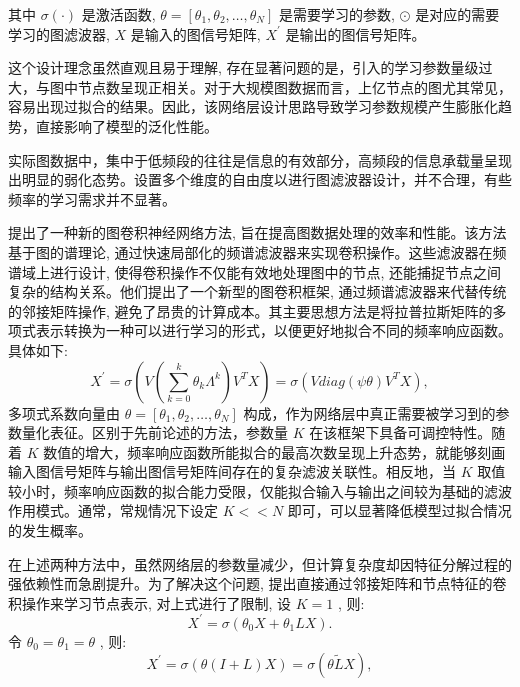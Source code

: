 其中 \(\sigma \left( \cdot \right)\) 是激活函数, \(\theta  = \left\lbrack  {{\theta }_{1}, {\theta }_{2}, \ldots , {\theta }_{N}}\right\rbrack\) 是需要学习的参数, \(\odot\) 是对应的需要学习的图滤波器, \({X}\) 是输入的图信号矩阵, \({{X}}^{\prime }\) 是输出的图信号矩阵。

这个设计理念虽然直观且易于理解, 存在显著问题的是，引入的学习参数量级过大，与图中节点数呈现正相关。对于大规模图数据而言，上亿节点的图尤其常见，容易出现过拟合的结果。因此，该网络层设计思路导致学习参数规模产生膨胀化趋势，直接影响了模型的泛化性能。

实际图数据中，集中于低频段的往往是信息的有效部分，高频段的信息承载量呈现出明显的弱化态势。设置多个维度的自由度以进行图滤波器设计，并不合理，有些频率的学习需求并不显著。

\textcite{2016_Defferrard_Convolutional_neural_networks_on_graphs_with_fast_localized_spectral_filtering} 提出了一种新的图卷积神经网络方法, 旨在提高图数据处理的效率和性能。该方法基于图的谱理论, 通过快速局部化的频谱滤波器来实现卷积操作。这些滤波器在频谱域上进行设计, 使得卷积操作不仅能有效地处理图中的节点, 还能捕捉节点之间复杂的结构关系。他们提出了一个新型的图卷积框架, 通过频谱滤波器来代替传统的邻接矩阵操作, 避免了昂贵的计算成本。其主要思想方法是将拉普拉斯矩阵的多项式表示转换为一种可以进行学习的形式，以便更好地拟合不同的频率响应函数。具体如下:
\begin{equation}
{X}^{\prime } = \sigma \left( {V\left( {\mathop{\sum }\limits_{{k = 0}}^{k}{\theta }_{k}{\Lambda }^{k}}\right) {V}^{T}X}\right)  = \sigma \left( {{Vdiag}\left( {\psi \theta }\right) {V}^{T}X}\right), 
\end{equation}
多项式系数向量由 \(\theta = \left\lbrack {{\theta }_{1}, {\theta }_{2}, \ldots , {\theta }_{N}}\right\rbrack\) 构成，作为网络层中真正需要被学习到的参数量化表征。区别于先前论述的方法，参数量 \({K}\) 在该框架下具备可调控特性。随着 \({K}\) 数值的增大，频率响应函数所能拟合的最高次数呈现上升态势，就能够刻画输入图信号矩阵与输出图信号矩阵间存在的复杂滤波关联性。相反地，当 \({K}\) 取值较小时，频率响应函数的拟合能力受限，仅能拟合输入与输出之间较为基础的滤波作用模式。通常，常规情况下设定 \({K} < < {N}\) 即可，可以显著降低模型过拟合情况的发生概率。

在上述两种方法中，虽然网络层的参数量减少，但计算复杂度却因特征分解过程的强依赖性而急剧提升。为了解决这个问题, \textcite{2016_Kipf_Semi_supervised_classification_with_graph_convolutionalnetworks} 提出直接通过邻接矩阵和节点特征的卷积操作来学习节点表示, 对上式进行了限制, 设 \({K} = 1\) , 则:
\begin{equation}
{X}^{\prime } = \sigma \left( {{\theta }_{0}X + {\theta }_{1}{LX}}\right).
\end{equation}
令 \({\theta }_{0} = {\theta }_{1} = \theta\) , 则:
\begin{equation}
{{X}}^{\prime } = \sigma \left( {\theta \left( {{I} + {L}}\right) {X}}\right)  = \sigma \left( {\theta \widetilde{{L}}{X}}\right), 
\end{equation}

